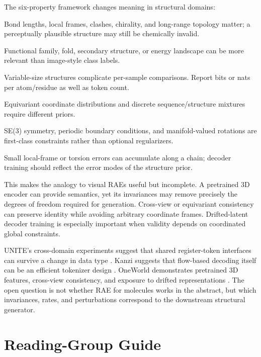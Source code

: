 \documentclass{article}
\begin{document}
The six-property framework changes meaning in structural domains:
\begin{description}[leftmargin=2.8cm,style=nextline,nosep]
\item[Fidelity] Bond lengths, local frames, clashes, chirality, and long-range topology matter; a perceptually plausible structure may still be chemically invalid.
\item[Semantics] Functional family, fold, secondary structure, or energy landscape can be more relevant than image-style class labels.
\item[Rate] Variable-size structures complicate per-sample comparisons. Report bits or nats per atom/residue as well as token count.
\item[Modelability] Equivariant coordinate distributions and discrete sequence/structure mixtures require different priors.
\item[Geometry] SE(3) symmetry, periodic boundary conditions, and manifold-valued rotations are first-class constraints rather than optional regularizers.
\item[Robustness] Small local-frame or torsion errors can accumulate along a chain; decoder training should reflect the error modes of the structure prior.
\end{description}

This makes the analogy to visual RAEs useful but incomplete. A pretrained 3D encoder can provide semantics, yet its invariances may remove precisely the degrees of freedom required for generation. Cross-view or equivariant consistency can preserve identity while avoiding arbitrary coordinate frames. Drifted-latent decoder training is especially important when validity depends on coordinated global constraints.

UNITE's cross-domain experiments suggest that shared register-token interfaces can survive a change in data type \citep{duggal2026unite}. Kanzi suggests that flow-based decoding itself can be an efficient tokenizer design \citep{dilip2026kanzi}. OneWorld demonstrates pretrained 3D features, cross-view consistency, and exposure to drifted representations \citep{gao2026oneworld}. The open question is not whether RAE for molecules works in the abstract, but which invariances, rates, and perturbations correspond to the downstream structural generator.

\section{Reading-Group Guide}
\label{app:reading}
\end{document}

